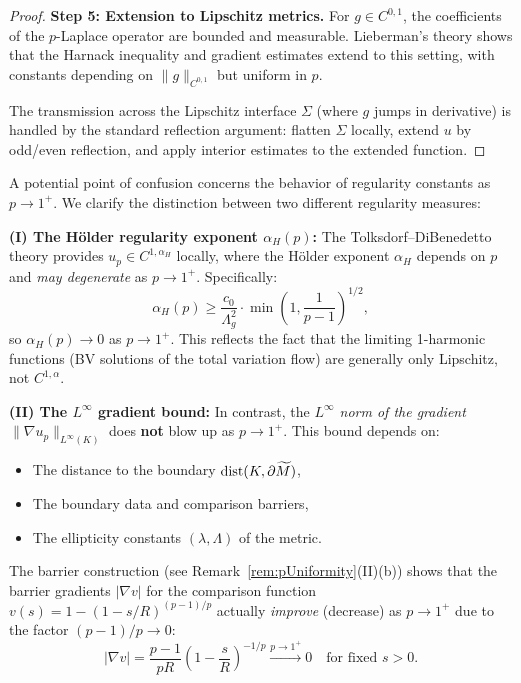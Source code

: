 \begin{proof}
\textbf{Step 5: Extension to Lipschitz metrics.}
For $g \in C^{0,1}$, the coefficients of the $p$-Laplace operator are bounded and measurable. Lieberman's theory \cite{lieberman1988} shows that the Harnack inequality and gradient estimates extend to this setting, with constants depending on $\|g\|_{C^{0,1}}$ but uniform in $p$.

The transmission across the Lipschitz interface $\Sigma$ (where $g$ jumps in derivative) is handled by the standard reflection argument: flatten $\Sigma$ locally, extend $u$ by odd/even reflection, and apply interior estimates to the extended function.
\end{proof}

\begin{remark}\label{rem:HolderVsGradient}
A potential point of confusion concerns the behavior of regularity constants as $p \to 1^+$. We clarify the distinction between two different regularity measures:

\textbf{(I) The H\"older regularity exponent $\alpha_H(p)$:} The Tolksdorf--DiBenedetto theory provides $u_p \in C^{1,\alpha_H}$ locally, where the H\"older exponent $\alpha_H$ depends on $p$ and \emph{may degenerate} as $p \to 1^+$. Specifically:
\[
    \alpha_H(p) \ge \frac{c_0}{\Lambda_g^2} \cdot \min\left(1, \frac{1}{p-1}\right)^{1/2},
\]
so $\alpha_H(p) \to 0$ as $p \to 1^+$. This reflects the fact that the limiting 1-harmonic functions (BV solutions of the total variation flow) are generally only Lipschitz, not $C^{1,\alpha}$.

\textbf{(II) The $L^\infty$ gradient bound:} In contrast, the \emph{$L^\infty$ norm of the gradient} $\|\nabla u_p\|_{L^\infty(K)}$ does \textbf{not} blow up as $p \to 1^+$. This bound depends on:
\begin{itemize}
    \item The distance to the boundary $\text{dist}(K, \partial\widetilde{M})$,
    \item The boundary data and comparison barriers,
    \item The ellipticity constants $(\lambda, \Lambda)$ of the metric.
\end{itemize}
The barrier construction (see Remark~\ref{rem:pUniformity}(II)(b)) shows that the barrier gradients $|\nabla v|$ for the comparison function $v(s) = 1 - (1 - s/R)^{(p-1)/p}$ actually \emph{improve} (decrease) as $p \to 1^+$ due to the factor $(p-1)/p \to 0$:
\[
    |\nabla v| = \frac{p-1}{pR} \left(1 - \frac{s}{R}\right)^{-1/p} \xrightarrow{p \to 1^+} 0 \quad \text{for fixed } s > 0.
\]


\end{remark}
